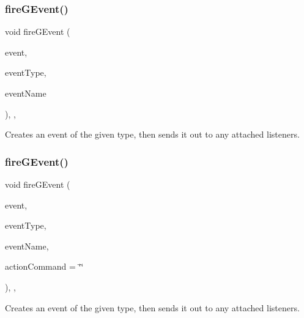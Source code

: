 \subsubsection{\texorpdfstring{fire\+G\+Event()}{fireGEvent()}\hspace{0.1cm}{\footnotesize\ttfamily [3/8]}}
{\footnotesize\ttfamily void fire\+G\+Event (\begin{DoxyParamCaption}\item[{Q\+Key\+Event $\ast$}]{event,  }\item[{Event\+Type}]{event\+Type,  }\item[{const std\+::string \&}]{event\+Name }\end{DoxyParamCaption})\hspace{0.3cm}{\ttfamily [protected]}, {\ttfamily [virtual]}, {\ttfamily [inherited]}}



Creates an event of the given type, then sends it out to any attached listeners. 

\mbox{\label{classGObservable_a119318675d2165bdf7dd853aaf881d4b}} 
\subsubsection{\texorpdfstring{fire\+G\+Event()}{fireGEvent()}\hspace{0.1cm}{\footnotesize\ttfamily [4/8]}}
{\footnotesize\ttfamily void fire\+G\+Event (\begin{DoxyParamCaption}\item[{Q\+Mouse\+Event $\ast$}]{event,  }\item[{Event\+Type}]{event\+Type,  }\item[{const std\+::string \&}]{event\+Name,  }\item[{const std\+::string \&}]{action\+Command = {\ttfamily \char`\"{}\char`\"{}} }\end{DoxyParamCaption})\hspace{0.3cm}{\ttfamily [protected]}, {\ttfamily [virtual]}, {\ttfamily [inherited]}}



Creates an event of the given type, then sends it out to any attached listeners. 

\mbox{\label{classGObservable_a63fd9034e1e1633c1c38eb342bfd34e9}} 
